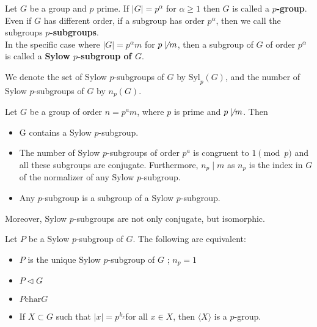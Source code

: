\documentclass{memoir}
\begin{document}
\begin{defn}
	Let \(G\) be a group and \(p\) prime. If \(\left| G \right| = p^{\alpha }\) for \(\alpha \geq 1\) then \(G\) is called a \textbf{\(p\)-group}. Even if \(G\) has different order, if a subgroup has order \(p^{\alpha }\), then we call the subgroups \textbf{\(p\)-subgroups}.\\

	In the specific case where \(\left| G \right| = p^{\alpha }m\) for \(p \not\mid m\), then a subgroup of \(G\) of order \(p^{\alpha }\) is called a \textbf{Sylow \(p\)-subgroup of \(G\)}.
\end{defn}
We denote the set of Sylow \(p\)-subgroups of \(G\) by \(\textrm{Syl}_p(G)\), and the number of Sylow \(p\)-subgroups of \(G\) by \(n_p(G)\).

\begin{thm}
	Let \(G\) be a group of order \(n = p^{a}m\), where \(p\) is prime and \(p \not\mid m\). Then
	\begin{itemize}
		\item G contains a Sylow \(p\)-subgroup.
		\item The number of Sylow \(p\)-subgroups of order \(p^{a}\) is congruent to \(1 \pmod p\) and all these subgroups are conjugate. Furthermore, \(n_p\mid m\) as \(n_p\) is the index in \(G\) of the normalizer of any Sylow \(p\)-subgroup.
		\item Any \(p\)-subgroup is a subgroup of a Sylow \(p\)-subgroup.
	\end{itemize}
\end{thm}
Moreover, Sylow \(p\)-subgroups are not only conjugate, but isomorphic.

\begin{cor}
	Let \(P\) be a Sylow \(p\)-subgroup of \(G\). The following are equivalent:
	\begin{itemize}
		\item \(P\) is the unique Sylow \(p\)-subgroup of \(G\) ; \(n_p = 1\) 
		\item \(P \triangleleft G\)
		\item \(P \textrm{char}G\) 
		\item If \(X\subset G\) such that \(\left| x \right| = p^{k_x}\)for all \(x \in X\), then \(\langle X \rangle \) is a \(p\)-group.
	\end{itemize}
\end{cor}
\end{document}
